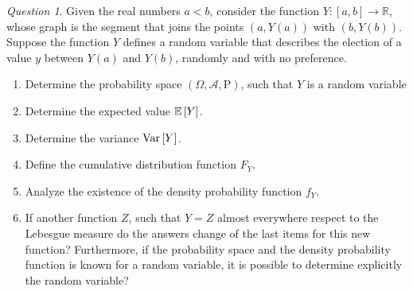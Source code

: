 \documentclass[11pt]{article}
\theoremstyle{definition}
\theoremstyle{remark}
\theoremstyle{remark}
\newtheorem{question}{Question}
\newcommand{\R}{{\mathbb{R}}}
\begin{document}
\begin{question}
  Given the real numbers $a < b$, consider the function
  $Y : [a, b] \rightarrow \R$, whose graph is the segment that joins
  the points $(a, Y(a))$ with $(b, Y(b))$. Suppose the function $Y$
  defines a random variable that describes the election of a value $y$
  between $Y(a)$ and $Y(b)$, randomly and with no preference.
  \begin{enumerate}[label=\alph*)]
  \item Determine the probability space
    $(\Omega, \mathcal{A}, \mathrm{P})$, such that $Y$ is a random variable
  \item Determine the expected value $\E{Y}$.
  \item Determine the variance $\V{Y}$.
  \item Define the cumulative distribution function $F_Y$.
  \item Analyze the existence of the density probability function
    $f_Y$.
  \item If another function $Z$, such that $Y=Z$ almost everywhere
    respect to the Lebesgue measure do the answers change of the last
    items for this new function? Furthermore, if the probability space
    and the density probability function is known for a random
    variable, it is possible to determine explicitly the random
    variable?
  \end{enumerate}
\end{question}
\end{document}
